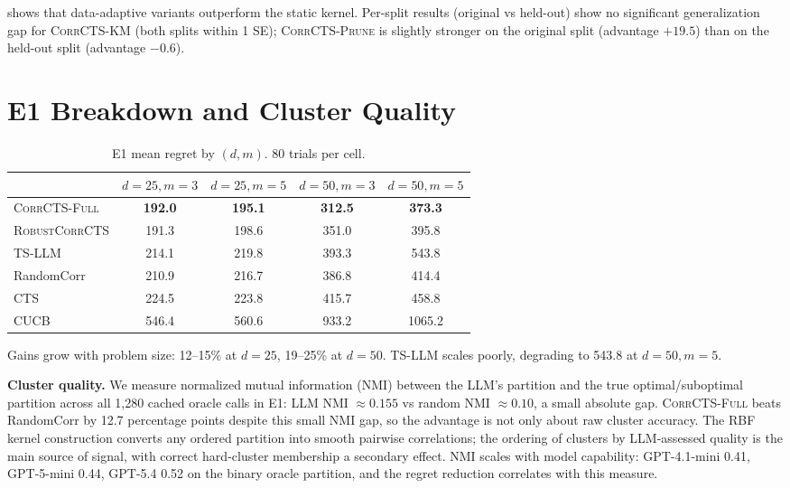 \documentclass{article}
\theoremstyle{plain}
\theoremstyle{definition}
\theoremstyle{remark}
\newcommand{\CorrFull}{\textsc{CorrCTS-Full}}
\newcommand{\RobustCorr}{\textsc{RobustCorrCTS}}
\newcommand{\EdgePrune}{\textsc{CorrCTS-Prune}}
\newcommand{\KMRefine}{\textsc{CorrCTS-KM}}
\begin{document}
 shows that data-adaptive variants outperform the static kernel.
Per-split results (original vs held-out) show no significant generalization gap for \KMRefine{} (both splits within 1 SE); \EdgePrune{} is slightly stronger on the original split (advantage $+19.5$) than on the held-out split (advantage $-0.6$).

\section{E1 Breakdown and Cluster Quality}\label{app:e1details}

\begin{table}[h]
\caption{E1 mean regret by $(d, m)$. 80 trials per cell.}
\label{tab:perdm}
\centering
\small
\begin{tabular}{@{}lcccc@{}}
\toprule
 & $d{=}25, m{=}3$ & $d{=}25, m{=}5$ & $d{=}50, m{=}3$ & $d{=}50, m{=}5$ \\
\midrule
\CorrFull & \textbf{192.0} & \textbf{195.1} & \textbf{312.5} & \textbf{373.3} \\
\RobustCorr & 191.3 & 198.6 & 351.0 & 395.8 \\
TS-LLM & 214.1 & 219.8 & 393.3 & 543.8 \\
RandomCorr & 210.9 & 216.7 & 386.8 & 414.4 \\
CTS & 224.5 & 223.8 & 415.7 & 458.8 \\
CUCB & 546.4 & 560.6 & 933.2 & 1065.2 \\
\bottomrule
\end{tabular}
\end{table}

Gains grow with problem size: 12--15\% at $d = 25$, 19--25\% at $d = 50$.
TS-LLM scales poorly, degrading to 543.8 at $d = 50, m = 5$.

\textbf{Cluster quality.}
We measure normalized mutual information (NMI) between the LLM's partition and the true optimal/suboptimal partition across all 1{,}280 cached oracle calls in E1: LLM NMI $\approx 0.155$ vs random NMI $\approx 0.10$, a small absolute gap.
\CorrFull{} beats RandomCorr by 12.7 percentage points despite this small NMI gap, so the advantage is not only about raw cluster accuracy.
The RBF kernel construction converts any ordered partition into smooth pairwise correlations; the ordering of clusters by LLM-assessed quality is the main source of signal, with correct hard-cluster membership a secondary effect.
NMI scales with model capability: GPT-4.1-mini 0.41, GPT-5-mini 0.44, GPT-5.4 0.52 on the binary oracle partition, and the regret reduction correlates with this measure.
\end{document}
